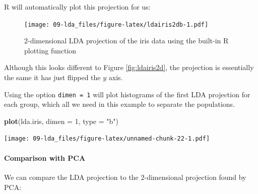 \documentclass[
]{book}
\newenvironment{Shaded}{\begin{snugshade}}{\end{snugshade}}
\newcommand{\AttributeTok}[1]{\textcolor[rgb]{0.13,0.29,0.53}{#1}}
\newcommand{\DecValTok}[1]{\textcolor[rgb]{0.00,0.00,0.81}{#1}}
\newcommand{\FunctionTok}[1]{\textcolor[rgb]{0.13,0.29,0.53}{\textbf{#1}}}
\newcommand{\NormalTok}[1]{#1}
\newcommand{\OtherTok}[1]{\textcolor[rgb]{0.56,0.35,0.01}{#1}}
\newcommand{\SpecialCharTok}[1]{\textcolor[rgb]{0.81,0.36,0.00}{\textbf{#1}}}
\newcommand{\StringTok}[1]{\textcolor[rgb]{0.31,0.60,0.02}{#1}}
\theoremstyle{definition}
\theoremstyle{definition}
\theoremstyle{definition}
\theoremstyle{definition}
\theoremstyle{remark}
\begin{document}
R will automatically plot this projection for us:

\begin{Shaded}
\end{Shaded}

\begin{figure}
\centering
\texttt{[image: 09-lda\_files/figure-latex/ldairis2db-1.pdf]}
\caption{\label{fig:ldairis2db}2-dimensional LDA projection of the iris data using the built-in R plotting function}
\end{figure}

Although this looks different to Figure \ref{fig:ldairis2d}, the projection is essentially the same it has just flipped the \(y\) axis.

Using the option \texttt{dimen\ =\ 1} will plot histograms of the first LDA projection for each group, which all we need in this example to separate the populations.

\begin{Shaded}
\begin{Highlighting}[]
\FunctionTok{plot}\NormalTok{(lda.iris, }\AttributeTok{dimen =} \DecValTok{1}\NormalTok{, }\AttributeTok{type =} \StringTok{"b"}\NormalTok{)}
\end{Highlighting}
\end{Shaded}

\texttt{[image: 09-lda\_files/figure-latex/unnamed-chunk-22-1.pdf]}

\paragraph*{Comparison with PCA}\label{comparison-with-pca}

We can compare the LDA projection to the 2-dimensional projection found by PCA:
\end{document}
